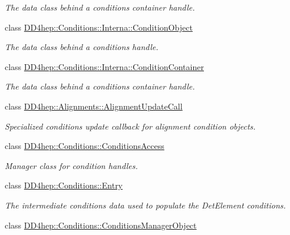 \begin{DoxyCompactItemize}
\begin{DoxyCompactList}\small\item\em The data class behind a conditions container handle. \item\end{DoxyCompactList}\item 
class \hyperlink{class_d_d4hep_1_1_conditions_1_1_interna_1_1_condition_object}{DD4hep::Conditions::Interna::ConditionObject}
\begin{DoxyCompactList}\small\item\em The data class behind a conditions handle. \item\end{DoxyCompactList}\item 
class \hyperlink{class_d_d4hep_1_1_conditions_1_1_interna_1_1_condition_container}{DD4hep::Conditions::Interna::ConditionContainer}
\begin{DoxyCompactList}\small\item\em The data class behind a conditions container handle. \item\end{DoxyCompactList}\item 
class \hyperlink{class_d_d4hep_1_1_alignments_1_1_alignment_update_call}{DD4hep::Alignments::AlignmentUpdateCall}
\begin{DoxyCompactList}\small\item\em Specialized conditions update callback for alignment condition objects. \item\end{DoxyCompactList}\item 
class \hyperlink{class_d_d4hep_1_1_conditions_1_1_conditions_access}{DD4hep::Conditions::ConditionsAccess}
\begin{DoxyCompactList}\small\item\em Manager class for condition handles. \item\end{DoxyCompactList}\item 
class \hyperlink{class_d_d4hep_1_1_conditions_1_1_entry}{DD4hep::Conditions::Entry}
\begin{DoxyCompactList}\small\item\em The intermediate conditions data used to populate the DetElement conditions. \item\end{DoxyCompactList}\item 
class \hyperlink{class_d_d4hep_1_1_conditions_1_1_conditions_manager_object}{DD4hep::Conditions::ConditionsManagerObject}

\end{DoxyCompactItemize}
